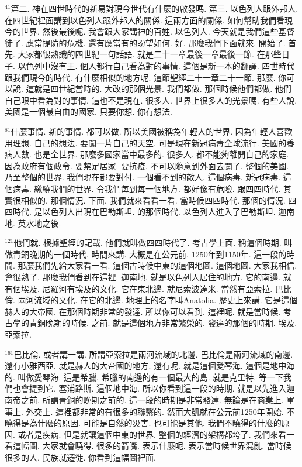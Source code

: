 \documentclass{book}
\begin{document}
$^{41}$第二.
神在四世時代的新易對現今世代有什麼的啟發嗎.
第三.
以色列人跟外邦人.
在四世紀裡面講到以色列人跟外邦人的關係.
這兩方面的關係.
如何幫助我們看現今的世界.
然後最後呢.
我會跟大家講神的百姓.
以色列人.
今天就是我們這些基督徒了.
應當提防的危機.
還有應當有的盼望如何.
好.
那麼我們下面就來.
開始了.
首先.
大家都很熟識的四世紀一句話語.
就是二十一章最後一章最後一節.
在那些日子.
以色列中沒有王.
個人都行自己看為對的事情.
這個是新一本的翻譯.
四世時代跟我們現今的時代.
有什麼相似的地方呢.
這節聖經二十一章二十一節.
那麼.
你可以說.
這就是四世紀當時的.
大改的那個光景.
我們都做.
那個時候他們都做.
他們自己眼中看為對的事情.
這也不是現在.
很多人.
世界上很多人的光景嗎.
有些人說.
美國是一個最自由的國家.
只要你想.
你有想法.

$^{81}$什麼事情.
新的事情.
都可以做.
所以美國被稱為年輕人的世界.
因為年輕人喜歡用理想.
自己的想法.
要闖一片自己的天空.
可是現在新冠病毒全球流行.
美國的養病人數.
也是全世界.
那麼多國家當中最多的.
很多人.
都不能夠離開自己的家庭.
因為政府有個政令.
要禁足居家.
要抗疫.
不可以隨意到外面去闖了.
整個的美國.
乃至整個的世界.
我們現在都要對付.
一個看不到的敵人.
這個病毒.
新冠病毒.
這個病毒.
繳繞我們的世界.
令我們每到每一個地方.
都好像有危險.
跟四四時代.
其實很相似的.
那個情況.
下面.
我們就來看看一看.
當時候四四時代.
那個的情況.
四四時代.
是以色列人出現在巴勒斯坦.
的那個時代.
以色列人進入了巴勒斯坦.
迦南地.
英水地之後.

$^{121}$他們就.
根據聖經的記載.
他們就叫做四四時代了.
考古學上面.
稱這個時期.
叫做青銅晚期的一個時代.
時間來講.
大概是在公元前.
1250年到1150年.
這一段的時間.
那麼我們先給大家看一看.
這個古時候中東的這個地圖.
這個地圖.
大家我相信.
會很熟了.
那麼我們看到在這裡.
迦南地.
就是以色列人居住的地方.
它的南邊.
就有個埃及.
尼羅河有埃及的文化.
它在東北邊.
就尼索波達米.
當然有亞索拉.
巴比倫.
兩河流域的文化.
在它的北邊.
地理上的名字叫Anatolia.
歷史上來講.
它是這個赫人的大帝國.
在那個時期非常的發達.
所以你可以看到.
這裡呢.
就是當時候.
考古學的青銅晚期的時候.
之前.
就是這個地方非常繁榮的.
發達的那個的時期.
埃及.
亞索拉.

$^{161}$巴比倫.
或者講一講.
所謂亞索拉是兩河流域的北邊.
巴比倫是兩河流域的南邊.
還有小雅西亞.
就是赫人的大帝國的地方.
還有呢.
就是這個愛琴海.
這個是地中海的.
叫做愛琴海.
這是希臘.
希臘的南邊的有一個最大的島.
就是克里特.
等一下我們也會提到它.
塞浦路斯.
這個地中海.
所以你看到這一段的時期.
就是以先進入迦南帝之前.
所謂青銅的晚期之前的.
這一段的時期是非常發達.
無論是在商業上.
軍事上.
外交上.
這裡都非常的有很多的聯繫的.
然而大凱就在公元前1250年開始.
不曉得是為什麼的原因.
可能是自然的災害.
也可能是其他.
我們不曉得的什麼的原因.
或者是疾病.
但是就讓這個中東的世界.
整個的經濟的架構都垮了.
我們來看一看這幅圖.
大家就會曉得.
很多的箭嘴.
表示什麼呢.
表示當時候世界混亂.
當時候很多的人.
民族就遷徙.
你看到這幅圖裡面.
\end{document}
